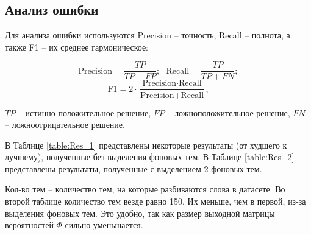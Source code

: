 \documentclass[a4paper, 12pt]{article}
\begin{document}
\subsection{Анализ ошибки}
    Для анализа ошибки используются Precision -- точность, Recall -- полнота, а также F1 -- их среднее гармоническое:

    \begin{equation}
        \text{Precision} = \frac{TP}{TP + FP}; ~~~ \text{Recall} = \frac{TP}{TP + FN};
    \end{equation}
    \begin{equation}
        \text{F1} = 2 \cdot \frac{\text{Precision} \cdot \text{Recall}}{\text{Precision} + \text{Recall}},
    \end{equation}

     $TP$ -- истинно-положительное решение, $FP$ -- ложноположительное решение, $FN$ -- ложноотрицательное решение.

    В Таблице \ref{table:Res_1} представлены некоторые результаты (от худшего к лучшему), полученные без выделения фоновых тем. В Таблице \ref{table:Res_2} представлены результаты, полученные с выделением 2 фоновых тем.

    Кол-во тем -- количество тем, на которые разбиваются слова в датасете. Во второй таблице количество тем везде равно 150. Их меньше, чем в первой, из-за выделения фоновых тем. Это удобно, так как размер выходной матрицы вероятностей $\Phi$ сильно уменьшается.
\end{document}

